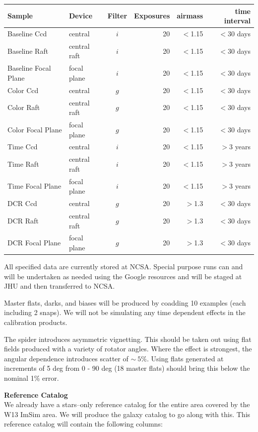 \documentclass[12pt]{article}
\begin{document}
\begin{table}
\begin{tabular}{llcrrr}
Sample & Device & Filter & Exposures & airmass & time interval \\
\hline  
Baseline Ccd             & central         & $i$  & 20 & $<$1.15 &$<$30 days \\
Baseline Raft              & central raft  & $i$  & 20 & $<$1.15 &$<$30 days \\
Baseline Focal Plane   & focal plane  &  $i$ & 20 & $<$1.15 &$<$30
days \\
\hline  
Color Ccd             & central         & $g$  & 20 & $<$1.15 &$<$30 days \\
Color Raft              & central raft  & $g$  & 20 & $<$1.15 &$<$30 days \\
Color Focal Plane   & focal plane  &  $g$ & 20 & $<$1.15 &$<$30 days \\
\hline 
Time Ccd             & central         & $i$  & 20 & $<$1.15 &$>$3 years \\
Time Raft              & central raft  & $i$  & 20 & $<$1.15 &$>$3 years \\
Time Focal Plane   & focal plane  &  $i$ & 20 & $<$1.15 &$>$3 years \\
\hline 
DCR Ccd             & central         & $g$  & 20 & $>$1.3 &$<$30 days \\
DCR Raft              & central raft  & $g$  & 20 & $>$1.3 &$<$30 days \\
DCR Focal Plane   & focal plane  & $g$  & 20 & $>$1.3 &$<$30 days
\end{tabular}
\end{table}


All specified data are currently stored at NCSA.  Special purpose runs
can and will be undertaken as needed using the Google resources and
will be staged at JHU and then transferred to NCSA.  

Master flats, darks, and biases will be produced by coadding 10
examples (each including 2 snaps).  We will not be simulating any time
dependent effects in the calibration products.

The spider introduces asymmetric vignetting.  This should be taken out
using flat fields produced with a variety of rotator angles.  Where
the effect is strongest, the angular dependence introduces scatter of
$\sim~5$\%.  Using flats generated at increments of 5 deg from 0 - 90
deg (18 master flats) should bring this below the nominal 1\% error.  

{\bf Reference Catalog}\\
We already have a stars--only reference catalog for the entire area
covered by the W13 ImSim area.  We will produce the galaxy catalog to
go along with this.  This reference catalog will contain the following
columns:
\end{document}
